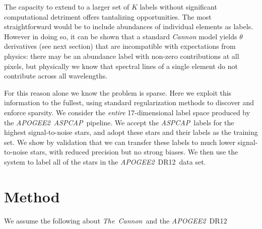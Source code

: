 \documentclass[12pt,preprint]{aastex}
\newcommand{\project}[1]{\textsl{#1}}
\newcommand{\TheCannon}{\project{The~Cannon}}
\newcommand{\acronym}[1]{{\small{#1}}}
\newcommand{\apogee}{\project{\acronym{APOGEE2}}}
\newcommand{\aspcap}{\project{\acronym{ASPCAP}}}
\newcommand{\dr}{\acronym{DR12}}
\begin{document}
The capacity to extend to a larger set of $K$ labels without significant
computational detriment offers tantalizing opportunities.  The most 
straightforward would be to include abundances of individual elements as labels.
However in doing so, it can be shown that a standard \emph{Cannon} model yields
$\theta$ derivatives (see next section) that are incompatible with expectations
from physics: there may be an abundance label with non-zero contributions at all
pixels, but physically we know that spectral lines of a single element do not 
contribute across all wavelengths.  

For this reason alone we know the problem is sparse.  Here we exploit this 
information to the fullest, using standard regularization methods to discover
and enforce sparsity. We consider the \emph{entire} 17-dimensional label space 
produced by the \apogee\ \aspcap\ pipeline.  We accept the \aspcap\ labels for 
the highest signal-to-noise stars, and adopt these stars and their labels as the
training set.  We show by validation that we can transfer these labels to much 
lower signal-to-noise stars, with reduced precision but no strong biases.  We
then use the system to label all of the stars in the \apogee\ \dr\ data set.




\section{Method}

We assume the following about \TheCannon\ and the \apogee\ \dr\:
\end{document}
